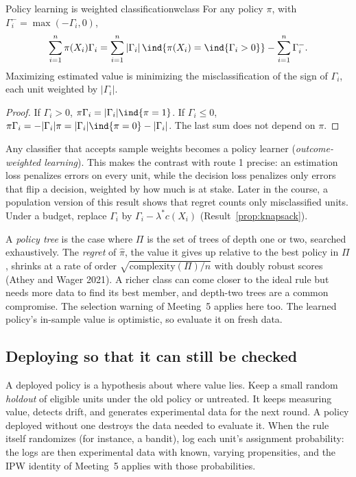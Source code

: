 \documentclass[11pt]{article}
\begin{document}
\begin{prop}{Policy learning is weighted classification}{wclass}
For any policy $\pi$, with $\Gamma_i^- = \max(-\Gamma_i, 0)$,
\[
  \sum_{i=1}^n \pi(X_i)\Gamma_i = \sum_{i=1}^n |\Gamma_i|\,\ind{\pi(X_i) = \ind{\Gamma_i > 0}} - \sum_{i=1}^n \Gamma_i^- .
\]
Maximizing estimated value is minimizing the misclassification of the sign of $\Gamma_i$, each unit weighted by $|\Gamma_i|$.
\end{prop}
\begin{proof}
If $\Gamma_i > 0$, $\pi\Gamma_i = |\Gamma_i|\ind{\pi = 1}$. If $\Gamma_i \le 0$, $\pi\Gamma_i = -|\Gamma_i|\pi = |\Gamma_i|\ind{\pi = 0} - |\Gamma_i|$.
The last sum does not depend on $\pi$.
\end{proof}

Any classifier that accepts sample weights becomes a policy learner (\emph{outcome-weighted learning}). This makes the
contrast with route 1 precise: an estimation loss penalizes errors on every unit, while the decision loss penalizes only errors
that flip a decision, weighted by how much is at stake. Later in the course, a population version of this result shows that regret counts
only misclassified units. Under a budget, replace $\Gamma_i$ by $\Gamma_i - \lambda^\ast c(X_i)$ (Result~\ref{prop:knapsack}).

A \emph{policy tree} is the case where $\Pi$ is the set of trees of depth one or two, searched exhaustively. The \emph{regret}
of $\hat\pi$, the value it gives up relative to the best policy in $\Pi$, shrinks at a rate of order $\sqrt{\text{complexity}(\Pi)/n}$
with doubly robust scores (Athey and Wager 2021). A richer class can come closer to the ideal rule but needs more data
to find its best member, and depth-two trees are a common compromise. The selection warning of Meeting~5 applies here
too. The learned policy's in-sample value is optimistic, so evaluate it on fresh data.

\subsection{Deploying so that it can still be checked}

A deployed policy is a hypothesis about where value lies. Keep a small random \emph{holdout} of eligible units under the
old policy or untreated. It keeps measuring value, detects drift, and generates experimental data for the next round. A
policy deployed without one destroys the data needed to evaluate it. When the rule itself randomizes (for instance, a
bandit), log each unit's assignment probability: the logs are then experimental data with known, varying propensities,
and the IPW identity of Meeting~5 applies with those probabilities.
\end{document}
